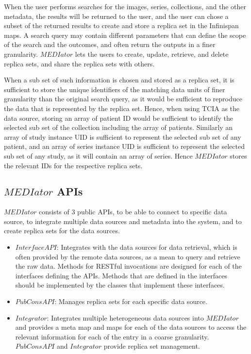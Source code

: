 \documentclass[letterpaper, 10 pt, conference]{ieeeconf}  %
\begin{document}
When the user performs searches for the images, series, collections, and the other metadata, the results will be returned to the user, and the user can chose a subset of the returned results to create and store a replica set in  the Infinispan maps. A search query may contain different parameters that can define the scope of the search and the outcomes, and often return the outputs in a finer granularity. $MEDIator$ lets the users to create, update, retrieve, and delete replica sets, and share the replica sets with others.

When a sub set of such information is chosen and stored as a replica set, it is sufficient to store the unique identifiers of the matching data units of finer granularity than the original search query, as it would be sufficient to reproduce the data that is represented by the replica set. Hence, when using TCIA as the data source, storing an array of patient ID would be sufficient to identify the selected sub set of the collection including the array of patients. Similarly an array of study instance UID is sufficient to represent the selected sub set of any patient, and an array of series instance UID is sufficient to represent the selected sub set of any study, as it will contain an array of series. Hence $MEDIator$ stores the relevant IDs for the respective replica sets.

\subsection{$MEDIator$ APIs}
$MEDIator$ consists of 3 public APIs, to be able to connect to specific data source, to integrate multiple data sources and metadata into the system, and to create replica sets for the data sources. 
\begin{itemize}
	\item $InterfaceAPI$: Integrates with the data sources for data retrieval, which is often provided by the remote data sources, as a mean to query and retrieve the raw data. Methods for RESTful invocations are designed for each of the interfaces defining the APIs. Methods that are defined in the interfaces should be implemented by the classes that implement these interfaces. 
	\item $PubConsAPI$: Manages replica sets for each specific data source.    		
	\item $Integrator$: Integrates multiple heterogeneous data sources into $MEDIator$ and provides a meta map and maps for each of the data sources to access the relevant information for each of the entry in a coarse granularity. $PubConsAPI$ and $Integrator$ provide replica set management.
\end{itemize}
\end{document}
